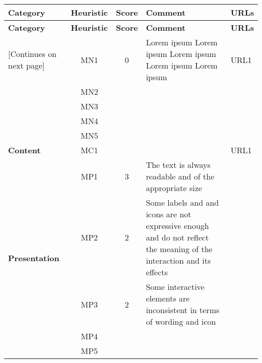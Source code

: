 \begin{tabularx}{\linewidth}{l c c X p{3cm}}
\toprule
\textbf{Category} & \textbf{Heuristic} & \textbf{Score} & \textbf{Comment} & \textbf{URLs} \\
\midrule
\endfirsthead
\toprule
\textbf{Category} & \textbf{Heuristic} & \textbf{Score} & \textbf{Comment} & \textbf{URLs} \\
\midrule
\endhead
\midrule
\footnotesize [Continues on next page]
\endfoot
\bottomrule
\endlastfoot

\multirow{5}{*}{\textbf{Navigation}}   
    & MN1 & 0 & Lorem ipsum Lorem ipsum Lorem ipsum Lorem ipsum Lorem ipsum & URL1 \\ \cmidrule{2-5} 
    & MN2 &  &  &\\ \cmidrule{2-5} 
    & MN3 &  &  &\\ \cmidrule{2-5} 
    & MN4 &  &  &\\ \cmidrule{2-5} 
    & MN5 &  &  &\\ \midrule
\textbf{Content}                       & MC1 &  &  & URL1  \\ \midrule
\multirow{5}{*}{\textbf{Presentation}} & MP1 & 3 & The text is always readable and of the appropriate size \\ \cmidrule{2-5} 
    & MP2 & 2 & Some labels and and icons are not expressive enough and do not reflect the meaning of the interaction and its effects\\ \cmidrule{2-5} 
    & MP3 & 2 & Some interactive elements are inconsistent in terms of wording and icon\\ \cmidrule{2-5} 
    & MP4 &  &  \\ \cmidrule{2-5} 
    & MP5 &  &
\end{tabularx}
